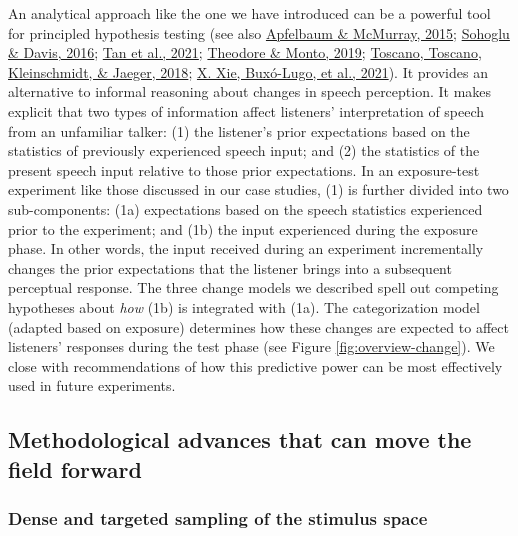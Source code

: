 \documentclass[
  11pt,
  man,floatsintext]{apa6}
\begin{document}
An analytical approach like the one we have introduced can be a powerful tool for principled hypothesis testing (see also \protect\hyperlink{ref-apfelbaum-mcmurray2015}{Apfelbaum \& McMurray, 2015}; \protect\hyperlink{ref-sohoglu-davis2016}{Sohoglu \& Davis, 2016}; \protect\hyperlink{ref-tan2021}{Tan et al., 2021}; \protect\hyperlink{ref-theodore-monto2019}{Theodore \& Monto, 2019}; \protect\hyperlink{ref-toscano2018}{Toscano, Toscano, Kleinschmidt, \& Jaeger, 2018}; \protect\hyperlink{ref-xie2021cognition}{X. Xie, Buxó-Lugo, et al., 2021}). It provides an alternative to informal reasoning about changes in speech perception. It makes explicit that two types of information affect listeners' interpretation of speech from an unfamiliar talker: (1) the listener's prior expectations based on the statistics of previously experienced speech input; and (2) the statistics of the present speech input relative to those prior expectations. In an exposure-test experiment like those discussed in our case studies, (1) is further divided into two sub-components: (1a) expectations based on the speech statistics experienced prior to the experiment; and (1b) the input experienced during the exposure phase. In other words, the input received during an experiment incrementally changes the prior expectations that the listener brings into a subsequent perceptual response. The three change models we described spell out competing hypotheses about \emph{how} (1b) is integrated with (1a). The categorization model (adapted based on exposure) determines how these changes are expected to affect listeners' responses during the test phase (see Figure \ref{fig:overview-change}). We close with recommendations of how this predictive power can be most effectively used in future experiments.

\hypertarget{methodological-advances-that-can-move-the-field-forward}{%
\subsection{Methodological advances that can move the field forward}\label{methodological-advances-that-can-move-the-field-forward}}

\hypertarget{dense-and-targeted-sampling-of-the-stimulus-space}{%
\subsubsection{Dense and targeted sampling of the stimulus space}\label{dense-and-targeted-sampling-of-the-stimulus-space}}
\end{document}
